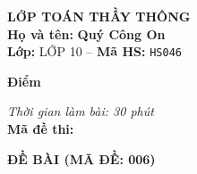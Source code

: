 \noindent
\begin{tcolorbox}[colback=white,colframe=black,arc=0mm,boxrule=0.8pt,top=4pt,bottom=4pt,left=6pt,right=6pt]
	\begin{minipage}[c]{0.44\textwidth}
		{\bfseries\large LỚP TOÁN THẦY THÔNG}\\[3pt]
		\textbf{Họ và tên:} \textbf{\large Quý Công On}\\[3pt]
		\textbf{Lớp:} LỚP 10 \quad -- \quad \textbf{Mã HS:} \texttt{HS046}
	\end{minipage}
	\hfill
	\begin{minipage}[c]{0.22\textwidth}
		\begin{tcolorbox}[colback=white,colframe=black,arc=0mm,boxrule=0.6pt,height=1.8cm,halign=center,valign=top,top=2pt]
			{\bfseries\normalsize Điểm}
		\end{tcolorbox}
	\end{minipage}
	\hfill
	\begin{minipage}[c]{0.30\textwidth}
		\raggedleft
		\textit{Thời gian làm bài: 30 phút}\\[4pt]
		\textbf{Mã đề thi:} 
	\end{minipage}
\end{tcolorbox}
\vspace{0.25cm}

\noindent\textbf{\large ĐỀ BÀI (MÃ ĐỀ: 006)}
\vspace{0.1cm}

